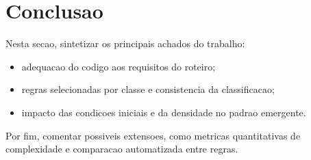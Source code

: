 \chapter{Conclusao}
\label{chap_conclusao}

Nesta secao, sintetizar os principais achados do trabalho:
\begin{itemize}
    \item adequacao do codigo aos requisitos do roteiro;
    \item regras selecionadas por classe e consistencia da classificacao;
    \item impacto das condicoes iniciais e da densidade no padrao emergente.
\end{itemize}

Por fim, comentar possiveis extensoes, como metricas quantitativas de complexidade e comparacao automatizada entre regras.
